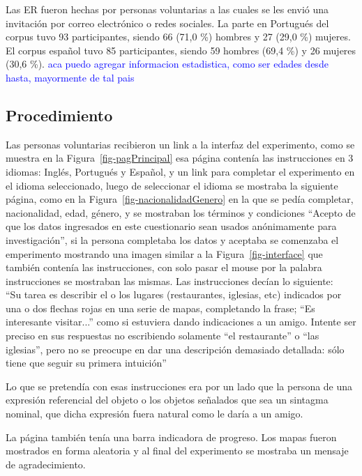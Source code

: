 Las ER fueron hechas por personas voluntarias a las cuales se les envi\'o una invitaci\'on por correo electr\'onico o redes sociales. La parte en Portugu\'es del corpus tuvo 93 participantes, siendo 66 (71,0 \%) hombres y 27 (29,0 \%) mujeres. El corpus espa\~nol tuvo 85 participantes, siendo 59 hombres (69,4 \%) y 26 mujeres (30,6 \%).
\textcolor{blue}{aca puedo agregar informacion estadistica, como ser edades desde hasta, mayormente de tal pais}
\subsection{Procedimiento}
\label{corpus-metodo}

Las personas voluntarias recibieron un link a la interfaz del experimento, como se muestra en la Figura~\ref{fig-pagPrincipal} esa p\'agina conten\'{i}a las instrucciones en 3 idiomas: Ingl\'es, Portugu\'es y Espa\~{n}ol, y un link para completar el experimento en el idioma seleccionado, luego de seleccionar el idioma se mostraba la siguiente p\'agina, como en la Figura~\ref{fig-nacionalidadGenero} en la que se ped\'{i}a completar, nacionalidad, edad, g\'enero, y se mostraban los t\'erminos y condiciones ``Acepto de que los datos ingresados en este cuestionario sean usados an\'onimamente para investigaci\'on'', si la persona completaba los datos y aceptaba se comenzaba el emperimento mostrando una imagen similar a la Figura~\ref{fig-interface} que tambi\'en conten\'{i}a las instrucciones, con solo pasar el mouse por la palabra instrucciones se mostraban las mismas.
Las instrucciones dec\'ian lo siguiente:\\
``Su tarea es describir el o los lugares (restaurantes, iglesias, etc) indicados por una o dos flechas rojas en una serie de mapas, completando la frase; ``Es interesante visitar...'' como si estuviera dando indicaciones a un amigo. Intente ser preciso en sus respuestas no escribiendo solamente ``el restaurante'' o ``las iglesias'', pero no se preocupe en dar una descripci\'on demasiado detallada: s\'olo tiene que seguir su primera intuici\'on''

Lo que se pretend\'ia con esas instrucciones era por un lado que la persona de una expresi\'on referencial del objeto o los objetos se\~nalados que sea un sintagma nominal, que dicha expresi\'on fuera natural como le dar\'ia a un amigo.

La p\'agina tambi\'en ten\'{i}a una barra indicadora de progreso. Los mapas fueron mostrados en forma aleatoria y al final del experimento se mostraba un mensaje de agradecimiento.

